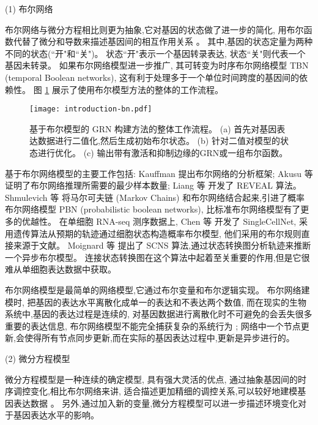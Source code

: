 (1) 布尔网络

布尔网络与微分方程相比则更为抽象,它对基因的状态做了进一步的简化,
用布尔函数代替了微分和导数来描述基因间的相互作用关系  。
其中,基因的状态定量为两种不同的状态(``开"和``关")。
状态``开"表示一个基因转录表达, 状态``关"则代表一个基因未转录。
如果布尔网络模型进一步推广, 其可转变为时序布尔网络模型 TBN (temporal Boolean networks), 这有利于处理多于一个单位时间跨度的基因间的依赖性。
图 \ref{fig:pre-bn} 展示了使用布尔模型方法的整体的工作流程。
\begin{figure}[!htbp]
    \centering
    \texttt{[image: introduction-bn.pdf]}
    \caption{
        基于布尔模型的 GRN 构建方法的整体工作流程。
        (a) 首先对基因表达数据进行二值化,然后生成初始布尔状态。
        (b) 针对二值对模型的状态进行优化。
        (c) 输出带有激活和抑制边缘的GRN或一组布尔函数。
    }
    \label{fig:pre-bn}
\end{figure}

基于布尔网络模型的主要工作包括:
 Kauffman  提出布尔网络的分析框架;
Akusu 等  证明了布尔网络推理所需要的最少样本数量;
Liang 等  开发了 REVEAL 算法。
Shmulevich 等  将马尔可夫链 (Markov Chains) 和布尔网络结合起来,引进了概率布尔网络模型 PBN (probabilistic boolean networks),
比标准布尔网络模型有了更多的优越性。
在单细胞 RNA-seq 测序数据上,
Chen 等  开发了 SingleCellNet,
采用遗传算法从预期的轨迹通过细胞状态构造概率布尔模型, 他们采用的布尔规则直接来源于文献。
Moignard 等  提出了 SCNS 算法,通过状态转换图分析轨迹来推断一个异步布尔模型。
连接状态转换图在这个算法中起着至关重要的作用,但是它很难从单细胞表达数据中获取。

布尔网络模型是最简单的网络模型,它通过布尔变量和布尔逻辑实现。
布尔网络建模时, 把基因的表达水平离散化成单一的表达和不表达两个数值,
而在现实的生物系统中,基因的表达过程是连续的,
对基因数据进行离散化时不可避免的会丢失很多重要的表达信息,
布尔网络模型不能完全捕获复杂的系统行为 ;
网络中一个节点更新,会使得所有节点同步更新,而在实际的基因表达过程中,更新是异步进行的。

(2) 微分方程模型

微分方程模型是一种连续的确定模型, 具有强大灵活的优点,
通过抽象基因间的时序调控变化,相比布尔网络来讲, 适合描述更加精细的调控关系,可以较好地建模基因表达数据 。
另外,通过加入新的变量,微分方程模型可以进一步描述环境变化对于基因表达水平的影响。

